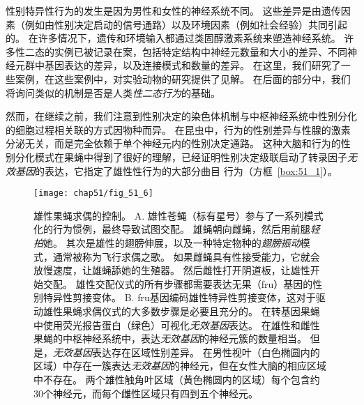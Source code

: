 性别特异性行为的发生是因为男性和女性的神经系统不同。
这些差异是由遗传因素（例如由性别决定启动的信号通路）以及环境因素（例如社会经验）共同引起的。
在许多情况下，遗传和环境输入都通过类固醇激素系统来塑造神经系统。
许多性二态的实例已被记录在案，包括特定结构中神经元数量和大小的差异、不同神经元群中基因表达的差异，以及连接模式和数量的差异。
在这里，我们研究了一些案例，在这些案例中，对实验动物的研究提供了见解。
在后面的部分中，我们将询问类似的机制是否是人类\textit{性二态行为}的基础。


然而，在继续之前，我们注意到性别决定的染色体机制与中枢神经系统中性别分化的细胞过程相关联的方式因物种而异。
在昆虫中，行为的性别差异与性腺的激素分泌无关，而是完全依赖于单个神经元内的性别决定通路。
这种大脑和行为的性别分化模式在果蝇中得到了很好的理解，已经证明性别决定级联启动了转录因子\textit{无效基因}的表达，它指定了雄性性行为的大部分曲目 行为（方框~\ref{box:51_1}）。


\begin{figure}[htbp]
	\centering
	\texttt{[image: chap51/fig\_51\_6]}
	\caption{雄性果蝇求偶的控制。
		A. 雄性苍蝇（标有星号）参与了一系列模式化的行为惯例，最终导致试图交配。
		雄蝇朝向雌蝇，然后用前腿\textit{轻拍}她。
		其次是雄性的翅膀伸展，以及一种特定物种的\textit{翅膀振动}模式，通常被称为飞行求偶之歌。
		如果雌蝇具有性接受能力，它就会放慢速度，让雄蝇舔她的生殖器。
		然后雌性打开阴道板，让雄性开始交配。
		雄性交配仪式的所有步骤都需要表达无果（fru）基因的性别特异性剪接变体\cite{greenspan2000courtship}。
		B. fru基因编码雄性特异性剪接变体，这对于驱动雄性果蝇求偶仪式的大多数步骤是必要且充分的。
		在转基因果蝇中使用荧光报告蛋白（绿色）可视化\textit{无效基因}表达。
		在雄性和雌性果蝇的中枢神经系统中，表达\textit{无效基因}的神经元簇的数量相当。
		但是，\textit{无效基因}表达存在区域性别差异。
		在男性视叶（白色椭圆内的区域）中存在一簇表达\textit{无效基因}的神经元，但在女性大脑的相应区域中不存在。
		两个雄性触角叶区域（黄色椭圆内的区域）每个包含约30个神经元，而每个雌性区域只有四到五个神经元\cite{kimura2005fruitless}。}
	\label{fig:51_6}
\end{figure}


